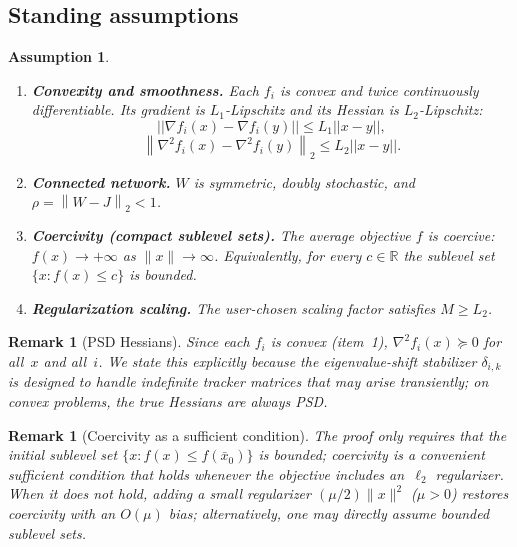 \documentclass[10pt,twocolumn,letterpaper]{article}
\def\cO{O}%
\def\one{1}%
\def\J{J}%
\def\norm#1{||#1||}%
\theoremstyle{compact}
\newtheorem{assumption}[theorem]{Assumption}
\theoremstyle{compactremark}
\newtheorem{remark}[theorem]{Remark}
\newcommand{\R}{\mathbb{R}}
\newcommand{\one}{\mathbf{1}}
\newcommand{\norm}[1]{\left\|#1\right\|}
\newcommand{\normtwo}[1]{\left\|#1\right\|_2}
\newcommand{\cO}{\mathcal{O}}
\newcommand{\J}{\left(\frac{1}{N}\one\one^\top\right)}
\begin{document}
	\subsection{Standing assumptions}
	\begin{assumption}\label{ass:standing}
		\begin{enumerate}[nosep,leftmargin=1em]
			\item \textbf{Convexity and smoothness.}
			Each $f_i$ is convex and twice continuously differentiable.
			Its gradient is $L_1$-Lipschitz and its Hessian is $L_2$-Lipschitz:
			\[
			\norm{\nabla f_i(x)\!-\!\nabla f_i(y)}\le L_1\norm{x\!-\!y},
			\]
			\vspace{-8pt}
			\[
			\normtwo{\nabla^2 f_i(x)\!-\!\nabla^2 f_i(y)}\le L_2\norm{x\!-\!y}.
			\]
			\item \textbf{Connected network.} $W$ is symmetric, doubly stochastic, and $\rho=\normtwo{W-\J}<1$.
			\item \textbf{Coercivity (compact sublevel sets).}
			The average objective $f$ is coercive: $f(x)\to+\infty$ as $\|x\|\to\infty$.
			Equivalently, for every $c\in\R$ the sublevel set $\{x:f(x)\le c\}$ is bounded.
			\item \textbf{Regularization scaling.} The user-chosen scaling factor satisfies $M\ge L_2$.
		\end{enumerate}
	\end{assumption}
	
	\begin{remark}[PSD Hessians]
	Since each $f_i$ is convex (item~1), $\nabla^2 f_i(x)\succeq 0$
	for all~$x$ and all~$i$.
	We state this explicitly because the eigenvalue-shift stabilizer
	$\delta_{i,k}$ is designed to handle indefinite tracker matrices
	that may arise transiently; on convex problems, the true Hessians
	are always PSD.
	\end{remark}
	
	\begin{remark}[Coercivity as a sufficient condition]
	The proof only requires that the initial sublevel set
	$\{x : f(x) \le f(\bar x_0)\}$ is bounded;
	coercivity is a convenient sufficient condition that holds
	whenever the objective includes an~$\ell_2$ regularizer.
	When it does not hold, adding a small regularizer
	$(\mu/2)\|x\|^2$ ($\mu>0$) restores coercivity with an $\cO(\mu)$ bias;
	alternatively, one may directly assume bounded sublevel sets.
	\end{remark}
	
\end{document}
